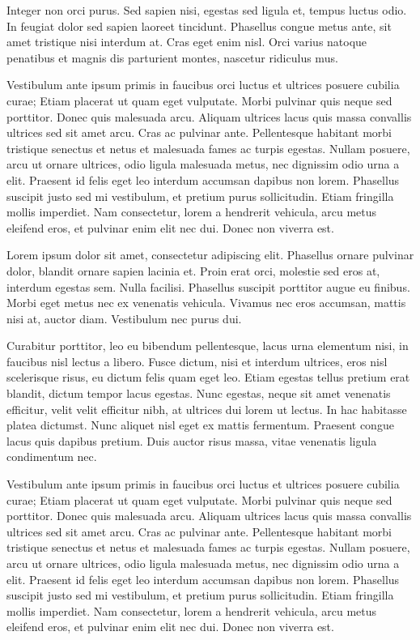 \documentclass{news}
\begin{document}
\begin{multicols}{4}
Integer non orci purus. Sed sapien nisi, egestas sed ligula et, tempus luctus odio. In feugiat dolor sed sapien laoreet tincidunt. Phasellus congue metus ante, sit amet tristique nisi interdum at. Cras eget enim nisl. Orci varius natoque penatibus et magnis dis parturient montes, nascetur ridiculus mus.

Vestibulum ante ipsum primis in faucibus orci luctus et ultrices posuere cubilia curae; Etiam placerat ut quam eget vulputate. Morbi pulvinar quis neque sed porttitor. Donec quis malesuada arcu. Aliquam ultrices lacus quis massa convallis ultrices sed sit amet arcu. Cras ac pulvinar ante. Pellentesque habitant morbi tristique senectus et netus et malesuada fames ac turpis egestas. Nullam posuere, arcu ut ornare ultrices, odio ligula malesuada metus, nec dignissim odio urna a elit. Praesent id felis eget leo interdum accumsan dapibus non lorem. Phasellus suscipit justo sed mi vestibulum, et pretium purus sollicitudin. Etiam fringilla mollis imperdiet. Nam consectetur, lorem a hendrerit vehicula, arcu metus eleifend eros, et pulvinar enim elit nec dui. Donec non viverra est.

Lorem ipsum dolor sit amet, consectetur adipiscing elit. Phasellus ornare pulvinar dolor, blandit ornare sapien lacinia et. Proin erat orci, molestie sed eros at, interdum egestas sem. Nulla facilisi. Phasellus suscipit porttitor augue eu finibus. Morbi eget metus nec ex venenatis vehicula. Vivamus nec eros accumsan, mattis nisi at, auctor diam. Vestibulum nec purus dui.

Curabitur porttitor, leo eu bibendum pellentesque, lacus urna elementum nisi, in faucibus nisl lectus a libero. Fusce dictum, nisi et interdum ultrices, eros nisl scelerisque risus, eu dictum felis quam eget leo. Etiam egestas tellus pretium erat blandit, dictum tempor lacus egestas. Nunc egestas, neque sit amet venenatis efficitur, velit velit efficitur nibh, at ultrices dui lorem ut lectus. In hac habitasse platea dictumst. Nunc aliquet nisl eget ex mattis fermentum. Praesent congue lacus quis dapibus pretium. Duis auctor risus massa, vitae venenatis ligula condimentum nec.

Vestibulum ante ipsum primis in faucibus orci luctus et ultrices posuere cubilia curae; Etiam placerat ut quam eget vulputate. Morbi pulvinar quis neque sed porttitor. Donec quis malesuada arcu. Aliquam ultrices lacus quis massa convallis ultrices sed sit amet arcu. Cras ac pulvinar ante. Pellentesque habitant morbi tristique senectus et netus et malesuada fames ac turpis egestas. Nullam posuere, arcu ut ornare ultrices, odio ligula malesuada metus, nec dignissim odio urna a elit. Praesent id felis eget leo interdum accumsan dapibus non lorem. Phasellus suscipit justo sed mi vestibulum, et pretium purus sollicitudin. Etiam fringilla mollis imperdiet. Nam consectetur, lorem a hendrerit vehicula, arcu metus eleifend eros, et pulvinar enim elit nec dui. Donec non viverra est.


\end{multicols}
\end{document}

